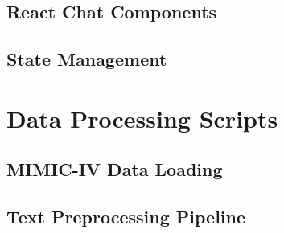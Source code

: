 \subsection{React Chat Components}

\subsection{State Management}

\section{Data Processing Scripts}

\subsection{MIMIC-IV Data Loading}

\subsection{Text Preprocessing Pipeline}

\blindtext
